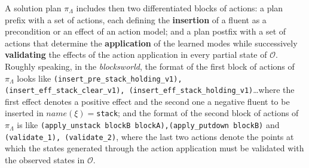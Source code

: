 \documentclass[runningheads]{llncs}
\begin{document}
A solution plan $\pi_\Lambda$ includes then two differentiated blocks of actions: a plan prefix with a set of actions, each defining the \textbf{insertion} of a fluent as a precondition or an effect of an action model; and a plan postfix with a set of actions that determine the \textbf{application} of the learned modes while successively \textbf{validating} the effects of the action application in every partial state of ${\mathcal O}$. Roughly speaking, in the \emph{blocksworld}, the format of the first block of actions of $\pi_\Lambda$ looks like {\tt{\small (insert\_pre\_stack\_holding\_v1)}, {\tt\small (insert\_eff\_stack\_clear\_v1)}, {\tt\small (insert\_eff\_stack\_holding\_v1)}}\ldots where the first effect denotes a positive effect and the second one a negative fluent to be inserted in $name(\xi)=${\tt{\small stack}}; and the format of the second block of actions of $\pi_\Lambda$ is like {\tt{\small (apply\_unstack blockB blockA),(apply\_putdown blockB)}} and {\tt{\small (validate\_1)}, {\tt\small (validate\_2)}}, where the last two actions denote the points at which the states generated through the action application must be validated with the observed states in ${\mathcal O}$.
\end{document}
